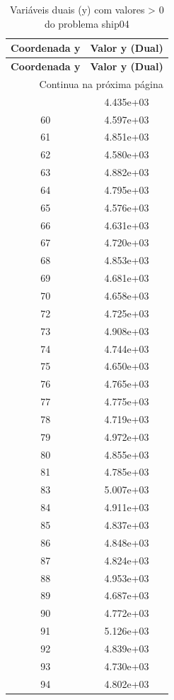 \documentclass[12pt]{article}
\begin{document}
\begin{longtable}{@{}cc@{}}
\caption{Variáveis duais (y) com valores > 0 do problema ship04} \\
\toprule
\textbf{Coordenada y} & \textbf{Valor y (Dual)} \\
\midrule
\endfirsthead

\toprule
\textbf{Coordenada y} & \textbf{Valor y (Dual)} \\
\midrule
\endhead

\midrule \multicolumn{2}{r}{{Continua na próxima página}} \\ \midrule
\endfoot

\bottomrule
\endlastfoot
59 & 4.435e+03 \\
60 & 4.597e+03 \\
61 & 4.851e+03 \\
62 & 4.580e+03 \\
63 & 4.882e+03 \\
64 & 4.795e+03 \\
65 & 4.576e+03 \\
66 & 4.631e+03 \\
67 & 4.720e+03 \\
68 & 4.853e+03 \\
69 & 4.681e+03 \\
70 & 4.658e+03 \\
72 & 4.725e+03 \\
73 & 4.908e+03 \\
74 & 4.744e+03 \\
75 & 4.650e+03 \\
76 & 4.765e+03 \\
77 & 4.775e+03 \\
78 & 4.719e+03 \\
79 & 4.972e+03 \\
80 & 4.855e+03 \\
81 & 4.785e+03 \\
83 & 5.007e+03 \\
84 & 4.911e+03 \\
85 & 4.837e+03 \\
86 & 4.848e+03 \\
87 & 4.824e+03 \\
88 & 4.953e+03 \\
89 & 4.687e+03 \\
90 & 4.772e+03 \\
91 & 5.126e+03 \\
92 & 4.839e+03 \\
93 & 4.730e+03 \\
94 & 4.802e+03 \\

\end{longtable}
\end{document}
